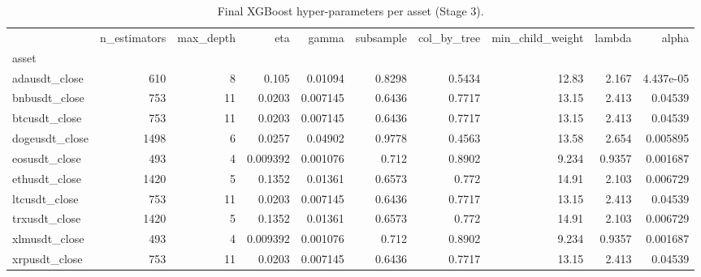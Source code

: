 \begin{table}
\caption{Final XGBoost hyper-parameters per asset (Stage 3).}
\label{tab:xgb_params}
\begin{tabular}{lrrrrrrrrr}
\toprule
 & n_estimators & max_depth & eta & gamma & subsample & col_by_tree & min_child_weight & lambda & alpha \\
asset &  &  &  &  &  &  &  &  &  \\
\midrule
adausdt_close & 610 & 8 & 0.105 & 0.01094 & 0.8298 & 0.5434 & 12.83 & 2.167 & 4.437e-05 \\
bnbusdt_close & 753 & 11 & 0.0203 & 0.007145 & 0.6436 & 0.7717 & 13.15 & 2.413 & 0.04539 \\
btcusdt_close & 753 & 11 & 0.0203 & 0.007145 & 0.6436 & 0.7717 & 13.15 & 2.413 & 0.04539 \\
dogeusdt_close & 1498 & 6 & 0.0257 & 0.04902 & 0.9778 & 0.4563 & 13.58 & 2.654 & 0.005895 \\
eosusdt_close & 493 & 4 & 0.009392 & 0.001076 & 0.712 & 0.8902 & 9.234 & 0.9357 & 0.001687 \\
ethusdt_close & 1420 & 5 & 0.1352 & 0.01361 & 0.6573 & 0.772 & 14.91 & 2.103 & 0.006729 \\
ltcusdt_close & 753 & 11 & 0.0203 & 0.007145 & 0.6436 & 0.7717 & 13.15 & 2.413 & 0.04539 \\
trxusdt_close & 1420 & 5 & 0.1352 & 0.01361 & 0.6573 & 0.772 & 14.91 & 2.103 & 0.006729 \\
xlmusdt_close & 493 & 4 & 0.009392 & 0.001076 & 0.712 & 0.8902 & 9.234 & 0.9357 & 0.001687 \\
xrpusdt_close & 753 & 11 & 0.0203 & 0.007145 & 0.6436 & 0.7717 & 13.15 & 2.413 & 0.04539 \\
\bottomrule
\end{tabular}
\end{table}
